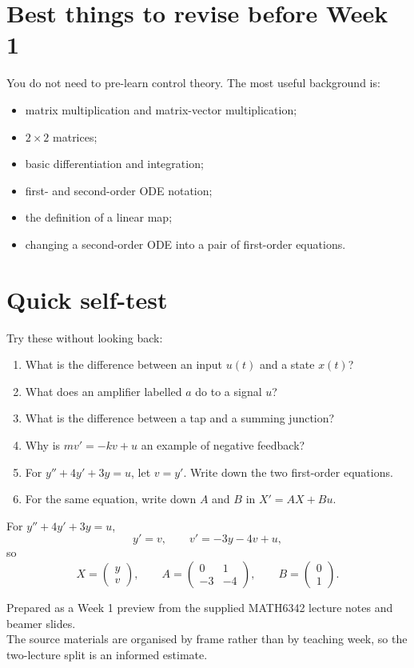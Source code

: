 \documentclass[11pt,a4paper]{article}
\begin{document}
\section*{Best things to revise before Week 1}
You do not need to pre-learn control theory. The most useful background is:
\begin{itemize}[leftmargin=1.5em]
\item matrix multiplication and matrix-vector multiplication;
\item $2\times2$ matrices;
\item basic differentiation and integration;
\item first- and second-order ODE notation;
\item the definition of a linear map;
\item changing a second-order ODE into a pair of first-order equations.
\end{itemize}

\section*{Quick self-test}
Try these without looking back:
\begin{enumerate}[leftmargin=1.8em]
\item What is the difference between an input $u(t)$ and a state $x(t)$?
\item What does an amplifier labelled $a$ do to a signal $u$?
\item What is the difference between a tap and a summing junction?
\item Why is $m v'=-kv+u$ an example of negative feedback?
\item For $y''+4y'+3y=u$, let $v=y'$. Write down the two first-order equations.
\item For the same equation, write down $A$ and $B$ in $X'=AX+Bu$.
\end{enumerate}

\begin{warnbox}
For $y''+4y'+3y=u$,
\[
y'=v,\qquad v'=-3y-4v+u,
\]
so
\[
X=\begin{pmatrix}y\\v\end{pmatrix},\qquad
A=\begin{pmatrix}0&1\\-3&-4\end{pmatrix},\qquad
B=\begin{pmatrix}0\\1\end{pmatrix}.
\]
\end{warnbox}

\vfill
\begin{center}
\small Prepared as a Week 1 preview from the supplied MATH6342 lecture notes and beamer slides.\\
The source materials are organised by frame rather than by teaching week, so the two-lecture split is an informed estimate.
\end{center}
\end{document}
